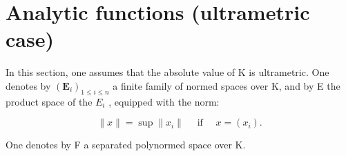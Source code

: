 \section{Analytic functions (ultrametric case)}

In this section, one assumes that the absolute value of K is ultrametric. One denotes by \((\mathbf{E}_{i})_{1\leqslant i\leqslant n}\) a finite family of normed spaces over K, and by E the product space of the \(E_{i}\) , equipped with the norm:

\[
\| x \| = \sup \| x _ {i} \| \quad \text { if } \quad x = (x _ {i}).
\]

One denotes by F a separated polynormed space over K.

